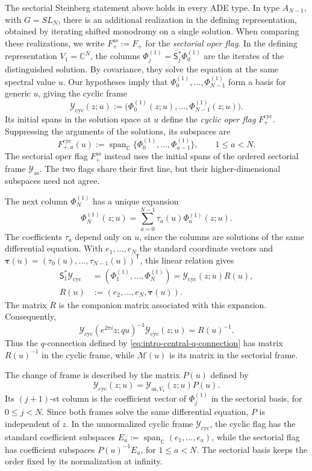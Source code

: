 \documentclass[11pt,leqno]{amsart}
\numberwithin{equation}{section}
\theoremstyle{plain}
\theoremstyle{definition}
\theoremstyle{plain}
\theoremstyle{definition}
\theoremstyle{remark}
\begin{document}
The sectorial Steinberg statement above holds in every ADE type.  In type $A_{N-1}$, with $G=SL_N$, there is an additional realization in the defining representation, obtained by iterating shifted monodromy on a single solution.  When comparing these realizations, we write $F_+^{\mathrm{as}}:=F_+$ for the \emph{sectorial oper flag}.  In the defining representation $V_1=\mathbb C^N$, the columns $\Phi_j^{(1)}=\mathsf S_j^*\Phi_0^{(1)}$ are the iterates of the distinguished solution.  By covariance, they solve the equation at the same spectral value $u$.  Our hypotheses imply that $\Phi_0^{(1)},\ldots,\Phi_{N-1}^{(1)}$ form a basis for generic $u$, giving the cyclic frame
\[
 \mathcal Y_{\mathrm{cyc}}(z;u)
 :=\bigl(\Phi_0^{(1)}(z;u),\ldots,\Phi_{N-1}^{(1)}(z;u)\bigr).
\]
Its initial spans in the solution space at $u$ define the \emph{cyclic oper flag} $F_+^{\mathrm{cyc}}$.  Suppressing the arguments of the solutions, its subspaces are
\[
 F_{+,a}^{\mathrm{cyc}}(u)
 :=\operatorname{span}_{\mathbb C}
   \bigl\{\Phi_0^{(1)},\ldots,
          \Phi_{a-1}^{(1)}\bigr\},
 \qquad 1\le a<N.
\]
The sectorial oper flag $F_+^{\mathrm{as}}$ instead uses the initial spans of the ordered sectorial frame $\mathcal Y_{\mathrm{as}}$.  The two flags share their first line, but their higher-dimensional subspaces need not agree.

The next column $\Phi_N^{(1)}$ has a unique expansion
\[
 \Phi_N^{(1)}(z;u)
 =\sum_{a=0}^{N-1}\tau_a(u)\Phi_a^{(1)}(z;u).
\]
The coefficients $\tau_a$ depend only on $u$, since the columns are solutions of the same differential equation.  With $e_1,\ldots,e_N$ the standard coordinate vectors and $\boldsymbol\tau(u)=(\tau_0(u),\ldots,\tau_{N-1}(u))^{\mathsf T}$, this linear relation gives
\[
 \begin{aligned}
 \mathsf S_1^*\mathcal Y_{\mathrm{cyc}}
 &=(\Phi_1^{(1)},\ldots,\Phi_N^{(1)})
   =\mathcal Y_{\mathrm{cyc}}(z;u)R(u),\\
 R(u)&:=(e_2,\ldots,e_N,\boldsymbol\tau(u)).
 \end{aligned}
\]
The matrix $R$ is the companion matrix associated with this expansion.  Consequently,
\[
 \mathcal Y_{\mathrm{cyc}}(e^{2\pi i}z;qu)^{-1}
 \mathcal Y_{\mathrm{cyc}}(z;u)=R(u)^{-1}.
\]
Thus the $q$-connection defined by \eqref{eq:intro-central-q-connection} has matrix $R(u)^{-1}$ in the cyclic frame, while $\mathscr M(u)$ is its matrix in the sectorial frame.

The change of frame is described by the matrix $P(u)$ defined by
\[
 \mathcal Y_{\mathrm{cyc}}(z;u)
 =\mathcal Y_{\mathrm{as},V_1}(z;u)P(u).
\]
Its $(j+1)$-st column is the coefficient vector of $\Phi_j^{(1)}$ in the sectorial basis, for $0\le j<N$.  Since both frames solve the same differential equation, $P$ is independent of $z$.  In the unnormalized cyclic frame $\mathcal Y_{\mathrm{cyc}}$, the cyclic flag has the standard coefficient subspaces $E_a:=\operatorname{span}_{\mathbb C}(e_1,\ldots,e_a)$, while the sectorial flag has coefficient subspaces $P(u)^{-1}E_a$, for $1\le a<N$.  The sectorial basis keeps the order fixed by its normalization at infinity.
\end{document}
